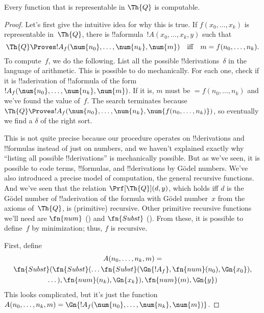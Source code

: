 \documentclass[../../../include/open-logic-section]{subfiles}
\begin{document}

\begin{lem}
Every function that is representable in $\Th{Q}$ is computable.
\end{lem}

\begin{proof}
Let's first give the intuitive idea for why this is true. If $f(x_0,
\dots, x_k)$ is representable in~$\Th{Q}$, there is
!!a{formula}~$!A(x_0, \dots, x_k, y)$ such that
\[
\Th{Q} \Proves !A_f(\num{n_0}, \dots, \num{n_k}, \num{m})
\quad\text{iff}\quad m = f(n_0, \dots, n_k).
\]
To compute~$f$, we do the following.  List all the possible
!!{derivation}s~$\delta$ in the language of arithmetic. This is
possible to do mechanically. For each one, check if it is
!!a{derivation} of !!a{formula} of the form~$!A_f(\num{n_0}, \dots,
\num{n_k}, \num{m})$. If it is, $m$ must be $= f(n_0, \dots, n_k)$ and
we've found the value of~$f$. The search terminates because $\Th{Q}
\Proves !A_f(\num{n_0}, \dots, \num{n_k}, \num{f(n_0, \dots, n_k)})$,
so eventually we find a $\delta$ of the right sort.

This is not quite precise because our procedure operates on
!!{derivation}s and !!{formula}s instead of just on numbers, and we
haven't explained exactly why ``listing all possible !!{derivation}s''
is mechanically possible.  But as we've seen, it is possible to code
terms, !!{formula}s, and !!{derivation}s by G\"odel numbers. We've
also introduced a precise model of computation, the general recursive
functions. And we've seen that the relation $\Prf[\Th{Q}](d,y)$, which holds
iff $d$ is the G\"odel number of !!a{derivation} of the formula with
G\"odel number~$x$ from the axioms of~$\Th{Q}$, is (primitive)
recursive. Other primitive recursive functions we'll need are
$\fn{num}$ () and $\fn{Subst}$
().  From these, it is possible to
define~$f$ by minimization; thus, $f$ is recursive.

First, define
\begin{multline*}
  A(n_0, \dots, n_k, m) = \\
  \fn{Subst}(\fn{Subst}(\dots\fn{Subst}(\Gn{!A_f}, \fn{num}(n_0), \Gn{x_0}),\\ \dots),
  \fn{num}(n_k),  \Gn{x_k}), \fn{num}(m), \Gn{y})
\end{multline*}
This looks complicated, but it's just the function $A(n_0, \dots, n_k,
m) = \Gn{!A_f(\num{n_0}, \dots, \num{n_k}, \num{m})}$.


\end{proof}
\end{document}
